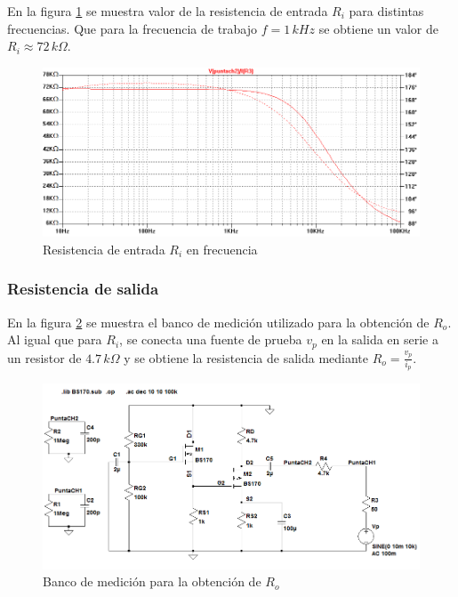 \documentclass[10pt,spanish,a4paper,notitlepage]{article}
\begin{document}
En la figura \ref{fig:B_Ri} se muestra valor
de la resistencia de entrada $R_i$ para distintas frecuencias.
Que para la frecuencia de trabajo $f=1\,\unit{kHz}$ se obtiene
un valor de $R_i \approx 72\,\unit{k\Omega}$.

\begin{figure}[H]
\centering
\includegraphics[scale=0.5]{simulaciones/B_sim_Ri.png}
\caption{Resistencia de entrada $R_i$ en frecuencia}
\label{fig:B_Ri}
\end{figure}

\subsubsection{Resistencia de salida}

En la figura \ref{fig:B_banco_Ro} se muestra el banco de medición utilizado para
la obtención de $R_o$.
Al igual que para $R_i$, se conecta una fuente de prueba $v_p$ en la salida en serie
a un resistor de $4.7\,\unit{k\Omega}$ y se obtiene la resistencia de salida mediante $R_o = \frac{v_p}{i_p}$.

\begin{figure}[H]
\centering
\includegraphics[scale=0.65]{circuitos/B_banco_Ro.png}
\caption{Banco de medición para la obtención de $R_o$}
\label{fig:B_banco_Ro}
\end{figure}
\end{document}
